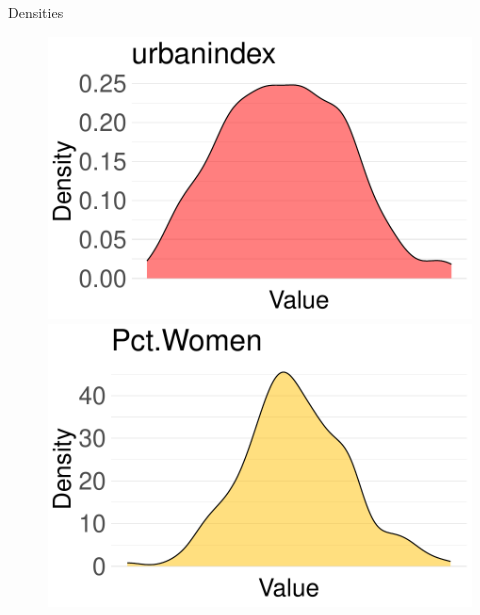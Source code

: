 \documentclass{beamer}
\begin{document}
\begin{frame}{Densities}
    \centering
\begin{figure}
    \centering
    \label{fig:enter-label}
    \begin{minipage}{0.3\textwidth}
        \centering
        \includegraphics[width=\textwidth]{plots/urbanindex_density_plot.pdf}
    \end{minipage}
    \hfill
    \begin{minipage}{0.3\textwidth}
        \centering
        \includegraphics[width=\textwidth]{plots/Pct.Women_density_plot.pdf}
    \end{minipage}
    \hfill
    \begin{minipage}{0.3\textwidth}
        \centering

\end{minipage}
\end{figure}
\end{frame}
\end{document}
